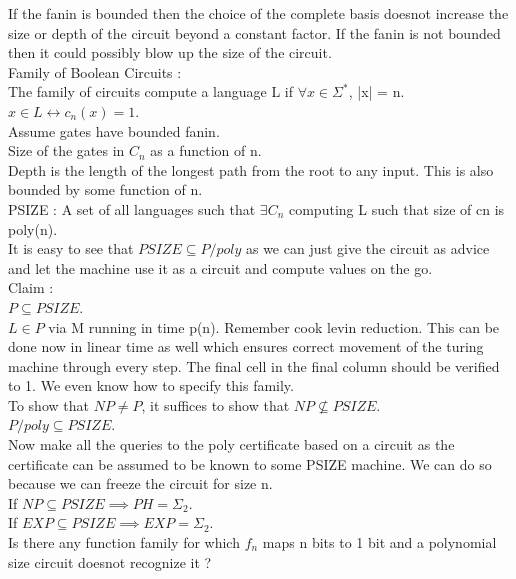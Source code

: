 \documentclass[solution,addpoints,12pt]{exam}
\begin{document}
If the fanin is bounded then the choice of the complete basis
doesnot increase the size or depth of the circuit beyond a constant
factor. If the fanin is not bounded then it could possibly
blow up the size of the circuit.\\

Family of Boolean Circuits :\\
The family of circuits compute a language L if $\forall x \in \Sigma^*$,
|x| = n. $x \in L \leftrightarrow c_n(x) = 1$.\\
Assume gates have bounded fanin.\\
Size of the gates in $C_n$ as a function of n.\\
Depth is the length of the longest path from the root to any input.
This is also bounded by some function of n.\\
PSIZE : A set of all languages such that $\exists C_n$ computing L
such that size of cn is poly(n).\\
It is easy to see that $PSIZE \subseteq P/poly$ as we can
just give the circuit as advice and let the machine use
it as a circuit and compute values on the go.\\
Claim :\\
$P \subseteq PSIZE$.\\
$L \in P$ via M running in time p(n). Remember cook levin
reduction. This can be done now in linear time as well which
ensures correct movement of the turing machine through every step.
The final cell in the final column should be verified to 1.
We even know how to specify this family.\\
To show that $NP \ne P$, it suffices to show that $NP \not \subseteq PSIZE$.\\
$P/poly \subseteq PSIZE$.\\
Now make all the queries to the poly certificate based on a circuit
as the certificate can be assumed to be known to some PSIZE machine.
We can do so because we can freeze the circuit for size n.\\

If $NP \subseteq PSIZE \implies PH = \Sigma_2$.\\
If $EXP \subseteq PSIZE \implies EXP = \Sigma_2$.\\

Is there any function family for which $f_n$ maps n bits to 1 bit and
a polynomial size circuit doesnot recognize it ?\\
\end{document}

